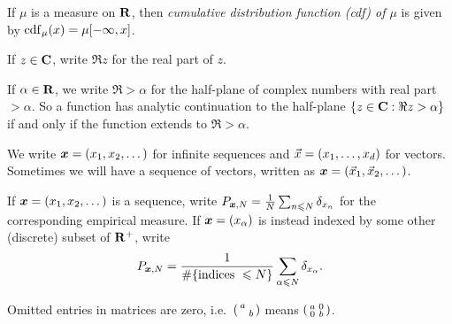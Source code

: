 If $\mu$ is a measure on $\mathbf{R}$, then \emph{cumulative distribution function 
(cdf) of $\mu$} is given by $\operatorname{cdf}_\mu(x) = \mu[-\infty,x]$. 

If $z\in \mathbf{C}$, write $\Re z$ for the real part of $z$. 

If $\alpha\in \mathbf{R}$, we write $\Re > \alpha$ for the half-plane of complex 
numbers with real part $> \alpha$. So a function has analytic continuation to 
the half-plane $\{z\in \mathbf{C} : \Re z > \alpha\}$ if and only if the function 
extends to $\Re > \alpha$. 

We write ${\boldsymbol x} = (x_1,x_2,\dots)$ for infinite sequences and 
$\vec{x} = (x_1,\dots,x_d)$ for vectors. Sometimes we will have a sequence of 
vectors, written as ${\boldsymbol x} = (\vec{x}_1,\vec{x}_2,\dots)$. 

If ${\boldsymbol x}=(x_1,x_2,\dots)$ is a sequence, write 
$P_{{\boldsymbol x},N} = \frac{1}{N} \sum_{n\leqslant N} \delta_{x_n}$ for the 
corresponding empirical measure. If ${\boldsymbol x}=(x_\alpha)$ is instead indexed by 
some other (discrete) subset of $\mathbf{R}^+$, write 
\[
	P_{{\boldsymbol x},N} = \frac{1}{\# \{\text{indices }\leqslant N\}}\sum_{\alpha \leqslant N} \delta_{x_\alpha} .
\]

Omitted entries in matrices are zero, i.e.~$\left(\begin{smallmatrix} a &  \\  & b \end{smallmatrix}\right)$ means 
$\left(\begin{smallmatrix} a & 0 \\ 0 & b \end{smallmatrix}\right)$. 
